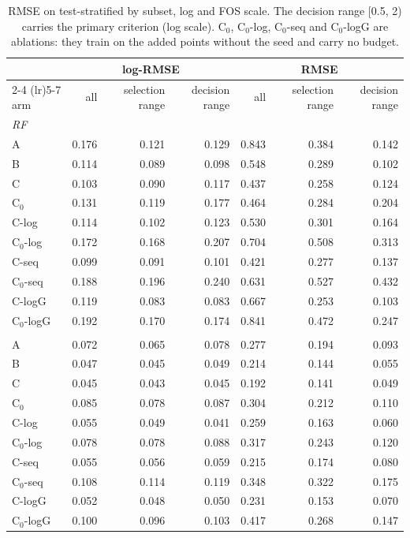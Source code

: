 \begin{table}[htbp]
\centering
\caption{RMSE on test-stratified by subset, log and FOS scale. The decision range [0.5, 2) carries the primary criterion (log scale). C$_0$, C$_0$-log, C$_0$-seq and C$_0$-logG are ablations: they train on the added points without the seed and carry no budget.}
\label{tab:test-stratified__fos-rmse:subsets}
\begin{tabular}{lrrrrrr}
\toprule
 & \multicolumn{3}{c}{log-RMSE} & \multicolumn{3}{c}{RMSE} \\
\cmidrule(lr){2-4} \cmidrule(lr){5-7}
arm & all & selection range & decision range & all & selection range & decision range \\
\midrule
\multicolumn{7}{l}{\textit{RF}} \\
A & 0.176 & 0.121 & 0.129 & 0.843 & 0.384 & 0.142 \\
B & 0.114 & 0.089 & 0.098 & 0.548 & 0.289 & 0.102 \\
C & 0.103 & 0.090 & 0.117 & 0.437 & 0.258 & 0.124 \\
C$_0$ & 0.131 & 0.119 & 0.177 & 0.464 & 0.284 & 0.204 \\
C-log & 0.114 & 0.102 & 0.123 & 0.530 & 0.301 & 0.164 \\
C$_0$-log & 0.172 & 0.168 & 0.207 & 0.704 & 0.508 & 0.313 \\
C-seq & 0.099 & 0.091 & 0.101 & 0.421 & 0.277 & 0.137 \\
C$_0$-seq & 0.188 & 0.196 & 0.240 & 0.631 & 0.527 & 0.432 \\
C-logG & 0.119 & 0.083 & 0.083 & 0.667 & 0.253 & 0.103 \\
C$_0$-logG & 0.192 & 0.170 & 0.174 & 0.841 & 0.472 & 0.247 \\
\addlinespace
\multicolumn{7}{l}{\textit{GBM}} \\
A & 0.072 & 0.065 & 0.078 & 0.277 & 0.194 & 0.093 \\
B & 0.047 & 0.045 & 0.049 & 0.214 & 0.144 & 0.055 \\
C & 0.045 & 0.043 & 0.045 & 0.192 & 0.141 & 0.049 \\
C$_0$ & 0.085 & 0.078 & 0.087 & 0.304 & 0.212 & 0.110 \\
C-log & 0.055 & 0.049 & 0.041 & 0.259 & 0.163 & 0.060 \\
C$_0$-log & 0.078 & 0.078 & 0.088 & 0.317 & 0.243 & 0.120 \\
C-seq & 0.055 & 0.056 & 0.059 & 0.215 & 0.174 & 0.080 \\
C$_0$-seq & 0.108 & 0.114 & 0.119 & 0.348 & 0.322 & 0.175 \\
C-logG & 0.052 & 0.048 & 0.050 & 0.231 & 0.153 & 0.070 \\
C$_0$-logG & 0.100 & 0.096 & 0.103 & 0.417 & 0.268 & 0.147 \\
\bottomrule
\end{tabular}
\end{table}
